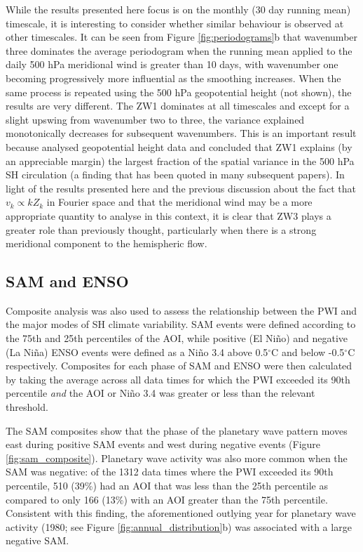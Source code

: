 While the results presented here focus is on the monthly (30 day running mean) timescale, it is interesting to consider whether similar behaviour is observed at other timescales. It can be seen from Figure \ref{fig:periodograms}b that wavenumber three dominates the average periodogram when the running mean applied to the daily 500 hPa meridional wind is greater than 10 days, with wavenumber one becoming progressively more influential as the smoothing increases. When the same process is repeated using the 500 hPa geopotential height (not shown), the results are very different. The ZW1 dominates at all timescales and except for a slight upswing from wavenumber two to three, the variance explained monotonically decreases for subsequent wavenumbers. This is an important result because \citet{vanLoon1972} analysed geopotential height data and concluded that ZW1 explains (by an appreciable margin) the largest fraction of the spatial variance in the 500 hPa SH circulation (a finding that has been quoted in many subsequent papers). In light of the results presented here and the previous discussion about the fact that $v_k \propto k Z_k$ in Fourier space and that the meridional wind may be a more appropriate quantity to analyse in this context, it is clear that ZW3 plays a greater role than previously thought, particularly when there is a strong meridional component to the hemispheric flow. 

  
\subsection{SAM and ENSO}

Composite analysis was also used to assess the relationship between the PWI and the major modes of SH climate variability. SAM events were defined according to the 75th and 25th percentiles of the AOI, while positive (El Ni\~{n}o) and negative (La Ni\~{n}a) ENSO events were defined as a Ni\~{n}o 3.4 above 0.5$^{\circ}$C and below -0.5$^{\circ}$C respectively. Composites for each phase of SAM and ENSO were then calculated by taking the average across all data times for which the PWI exceeded its 90th percentile \textit{and} the AOI or Ni\~{n}o 3.4 was greater or less than the relevant threshold. 

The SAM composites show that the phase of the planetary wave pattern moves east during positive SAM events and west during negative events (Figure \ref{fig:sam_composite}). Planetary wave activity was also more common when the SAM was negative: of the 1312 data times where the PWI exceeded its 90th percentile, 510 (39\%) had an AOI that was less than the 25th percentile as compared to only 166 (13\%) with an AOI greater than the 75th percentile. Consistent with this finding, the aforementioned outlying year for planetary wave activity (1980; see Figure \ref{fig:annual_distribution}b) was associated with a large negative SAM.

